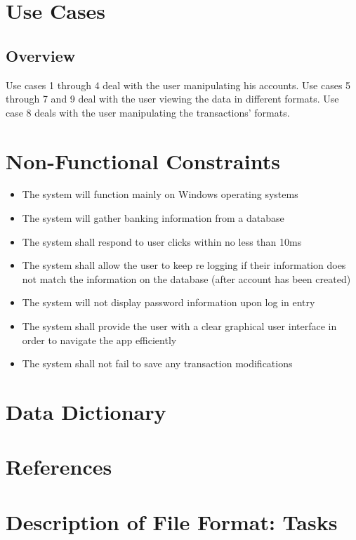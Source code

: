 \section{Use Cases}
\subsection{Overview}
Use cases 1 through 4 deal with the user manipulating his accounts. Use cases 5 through 7 and 9 deal with the user viewing the data in different formats. Use case 8 deals with the user manipulating the transactions' formats.

\section{Non-Functional Constraints}

\begin{itemize}
    \item The system will function mainly on Windows operating systems
    \item The system will gather banking information from a database
    \item The system shall respond to user clicks within no less than 10ms
    \item The system shall allow the user to keep re logging if their information does not match the information on the database (after account has been created)
    \item The system will not display password information upon log in entry
    \item The system shall provide the user with a clear graphical user interface in order to navigate the app efficiently
    \item The system shall not fail to save any transaction modifications
\end{itemize}

\section{Data Dictionary}

\section{References}

\appendix

\section{Description of File Format: Tasks}

